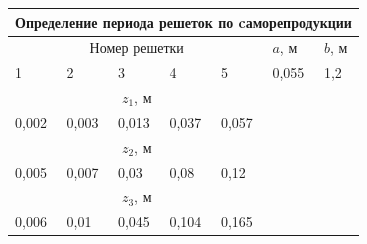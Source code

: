 \documentclass[a4paper,12pt]{article}
\begin{document}
\begin{table}[h!]
	\begin{tabular}{cllllll}
		\\ \hline
		\multicolumn{7}{|c|}{Определение   периода решеток по cаморепродукции}                                                                                                                                                    \\ \hline
		\multicolumn{5}{|c|}{Номер решетки}                                                                                                                            & \multicolumn{1}{l|}{$a$, м}  & \multicolumn{1}{l|}{$b$, м} \\ \hline
		\multicolumn{1}{|l|}{1}        & \multicolumn{1}{l|}{2}        & \multicolumn{1}{l|}{3}        & \multicolumn{1}{l|}{4}        & \multicolumn{1}{l|}{5}        & \multicolumn{1}{l|}{0,055} & \multicolumn{1}{l|}{1,2}  \\ \hline
		\multicolumn{5}{|c|}{$z_1$, м}                                                                                                                                  &                            &                           \\ \cline{1-5}
		\multicolumn{1}{|l|}{0,002}    & \multicolumn{1}{l|}{0,003}    & \multicolumn{1}{l|}{0,013}    & \multicolumn{1}{l|}{0,037}    & \multicolumn{1}{l|}{0,057}    &                            &                           \\ \cline{1-5}
		\multicolumn{5}{|c|}{$z_2$, м}                                                                                                                                  &                            &                           \\ \cline{1-5}
		\multicolumn{1}{|l|}{0,005}    & \multicolumn{1}{l|}{0,007}    & \multicolumn{1}{l|}{0,03}     & \multicolumn{1}{l|}{0,08}     & \multicolumn{1}{l|}{0,12}     &                            &                           \\ \cline{1-5}
		\multicolumn{5}{|c|}{$z_3$, м}                                                                                                                                  &                            &                           \\ \cline{1-5}
		\multicolumn{1}{|l|}{0,006}    & \multicolumn{1}{l|}{0,01}     & \multicolumn{1}{l|}{0,045}    & \multicolumn{1}{l|}{0,104}    & \multicolumn{1}{l|}{0,165}    &                            &                           \\ \cline{1-5}

\end{tabular}
\end{table}
\end{document}
